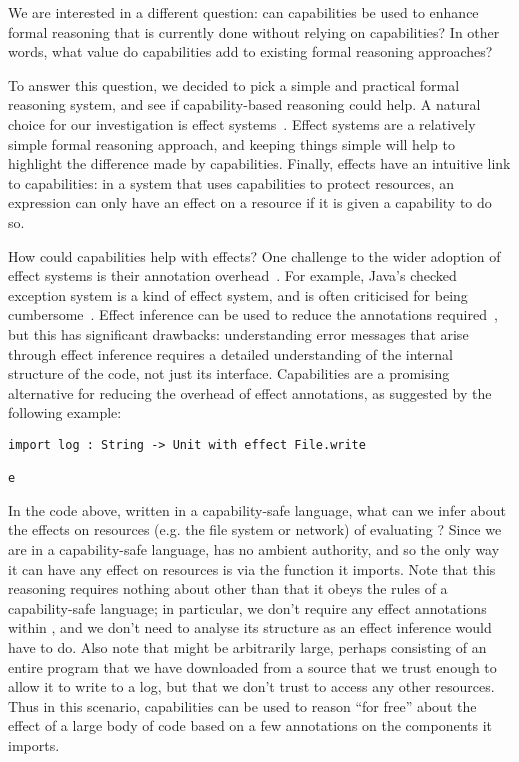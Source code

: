 We are interested in a different question: can capabilities be used to
enhance formal reasoning that is currently done without relying on
capabilities?  In other words, what value do capabilities add to
existing formal reasoning approaches?

To answer this question, we decided to pick a simple and practical
formal reasoning system, and see if capability-based reasoning could
help.  A natural choice for our investigation is effect
systems~\cite{nielson99}.  Effect systems are a relatively simple
formal reasoning approach, and keeping things simple will help to
highlight the difference made by capabilities.  Finally, effects have
an intuitive link to capabilities: in a system that uses capabilities
to protect resources, an expression can only have an effect on a
resource if it is given a capability to do so.

How could capabilities help with effects?  One challenge to the wider
adoption of effect systems is their annotation overhead~\cite{rytz12}.
For example, Java's checked exception system is a kind of effect
system, and is often criticised for being
cumbersome~\cite{Kiniry2006}.  Effect inference can be used to reduce
the annotations required~\cite{koka14}, but this has significant
drawbacks: understanding error messages that arise through effect
inference requires a detailed understanding of the internal structure
of the code, not just its interface.  Capabilities are a promising
alternative for reducing the overhead of effect annotations, as
suggested by the following example:

\begin{lstlisting}
import log : String -> Unit with effect File.write

e
\end{lstlisting}

In the code above, written in a capability-safe language, what can we
infer about the effects on resources (e.g. the file system or network)
of evaluating ?  Since we are in a capability-safe language,
 has no ambient authority, and so the only way it can have any
effect on resources is via the  function it imports.  Note
that this reasoning requires nothing about  other than that it
obeys the rules of a capability-safe language; in particular, we don't
require any effect annotations within , and we don't need to
analyse its structure as an effect inference would have to do.  Also
note that  might be arbitrarily large, perhaps consisting of
an entire program that we have downloaded from a source that we trust
enough to allow it to write to a log, but that we don't trust to
access any other resources.  Thus in this scenario, capabilities can
be used to reason ``for free'' about the effect of a large body of
code based on a few annotations on the components it imports.

